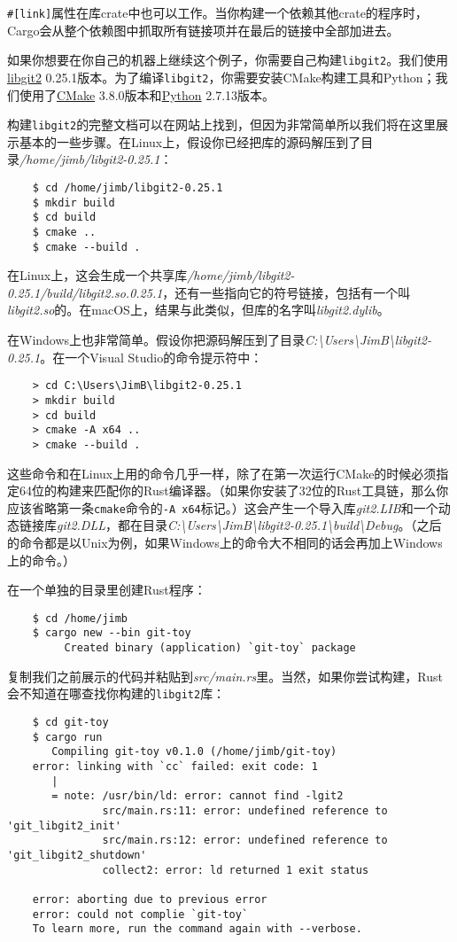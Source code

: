 \texttt{\#[link]}属性在库crate中也可以工作。当你构建一个依赖其他crate的程序时，Cargo会从整个依赖图中抓取所有链接项并在最后的链接中全部加进去。

如果你想要在你自己的机器上继续这个例子，你需要自己构建\texttt{libgit2}。我们使用\href{https://libgit2.org/}{libgit2} 0.25.1版本。为了编译\texttt{libgit2}，你需要安装CMake构建工具和Python；我们使用了\href{https://cmake.org/}{CMake} 3.8.0版本和\href{https://www.python.org/}{Python} 2.7.13版本。

构建\texttt{libgit2}的完整文档可以在网站上找到，但因为非常简单所以我们将在这里展示基本的一些步骤。在Linux上，假设你已经把库的源码解压到了目录\emph{/home/jimb/libgit2-0.25.1}：
\begin{verbatim}
    $ cd /home/jimb/libgit2-0.25.1
    $ mkdir build
    $ cd build
    $ cmake ..
    $ cmake --build .
\end{verbatim}

在Linux上，这会生成一个共享库\emph{/home/jimb/libgit2-0.25.1/build/libgit2.so.0.25.1}，还有一些指向它的符号链接，包括有一个叫\emph{libgit2.so}的。在macOS上，结果与此类似，但库的名字叫\emph{libgit2.dylib}。

在Windows上也非常简单。假设你把源码解压到了目录\emph{C:\textbackslash{}Users\textbackslash{}JimB\textbackslash{}libgit2-0.25.1}。在一个Visual Studio的命令提示符中：
\begin{verbatim}
    > cd C:\Users\JimB\libgit2-0.25.1
    > mkdir build
    > cd build
    > cmake -A x64 ..
    > cmake --build .
\end{verbatim}

这些命令和在Linux上用的命令几乎一样，除了在第一次运行CMake的时候必须指定64位的构建来匹配你的Rust编译器。（如果你安装了32位的Rust工具链，那么你应该省略第一条\texttt{cmake}命令的\texttt{-A x64}标记。）这会产生一个导入库\emph{git2.LIB}和一个动态链接库\emph{git2.DLL}，都在目录\emph{C:\textbackslash{}Users\textbackslash{}JimB\textbackslash{}libgit2-0.25.1\textbackslash{}build\textbackslash{}Debug}。（之后的命令都是以Unix为例，如果Windows上的命令大不相同的话会再加上Windows上的命令。）

在一个单独的目录里创建Rust程序：
\begin{verbatim}
    $ cd /home/jimb
    $ cargo new --bin git-toy
         Created binary (application) `git-toy` package
\end{verbatim}

复制我们之前展示的代码并粘贴到\emph{src/main.rs}里。当然，如果你尝试构建，Rust会不知道在哪查找你构建的\texttt{libgit2}库：
\begin{verbatim}
    $ cd git-toy
    $ cargo run
       Compiling git-toy v0.1.0 (/home/jimb/git-toy)
    error: linking with `cc` failed: exit code: 1
       |
       = note: /usr/bin/ld: error: cannot find -lgit2
               src/main.rs:11: error: undefined reference to 'git_libgit2_init'
               src/main.rs:12: error: undefined reference to 'git_libgit2_shutdown'
               collect2: error: ld returned 1 exit status
    
    error: aborting due to previous error
    error: could not complie `git-toy`
    To learn more, run the command again with --verbose.
\end{verbatim}

